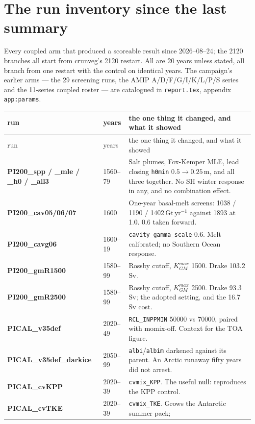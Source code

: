 \documentclass[10pt]{article}
\begin{document}
\section{The run inventory since the last summary}\label{sec:runs}

Every coupled arm that produced a scoreable result since 2026--08--24; the 2120 branches all
start from crunveg's 2120 restart. All are 20 years
unless stated, all branch from one restart with the control on identical years. The
campaign's earlier arms --- the 29 screening runs, the AMIP A/D/F/G/I/K/L/P/S series and
the 11-series coupled roster --- are catalogued in \texttt{report.tex}, appendix
\texttt{app:params}.

{\small
\begin{longtable}{p{3.3cm}p{2.3cm}p{10.2cm}}
\toprule
run & years & the one thing it changed, and what it showed \\
\midrule
\endfirsthead
\toprule
run & years & the one thing it changed, and what it showed \\
\midrule
\endhead
\textbf{PI200\_spp / \_mle / \_h0 / \_all3} & 1560--79 & Salt plumes, Fox-Kemper MLE,
lead closing \texttt{h0min} $0.5\to0.25$\,m, and all three together. No SH winter response
in any, and no combination effect. \\
\textbf{PI200\_cav05/06/07} & 1600 & One-year basal-melt screens: 1038 / 1190 /
1402\,Gt\,yr$^{-1}$ against 1893 at 1.0. 0.6 taken forward. \\
\textbf{PI200\_cavg06}   & 1600--19 & \texttt{cavity\_gamma\_scale} 0.6. Melt calibrated;
no Southern Ocean response. \\
\textbf{PI200\_gmR1500}  & 1580--99 & Rossby cutoff, $K_{GM}^{max}$ 1500. Drake 103.2\,Sv. \\
\textbf{PI200\_gmR2500}  & 1580--99 & Rossby cutoff, $K_{GM}^{max}$ 2500. Drake 93.3\,Sv;
the adopted setting, and the 16.7\,Sv cost. \\
\addlinespace
\textbf{PICAL\_v35def} & 2020--49 & \texttt{RCL\_INPPMIN} 50000 vs 70000, paired with
momix-off. Context for the TOA figure. \\
\textbf{PICAL\_v35def\_darkice} & 2050--99 & \texttt{albi}/\texttt{albim} darkened against
its parent. An Arctic runaway fifty years did not arrest. \\
\addlinespace
\textbf{PICAL\_cvKPP}    & 2020--39 & \texttt{cvmix\_KPP}. The useful null: reproduces the
KPP control. \\
\textbf{PICAL\_cvTKE}    & 2020--39 & \texttt{cvmix\_TKE}. Grows the Antarctic summer pack;

\end{longtable}}
\end{document}
